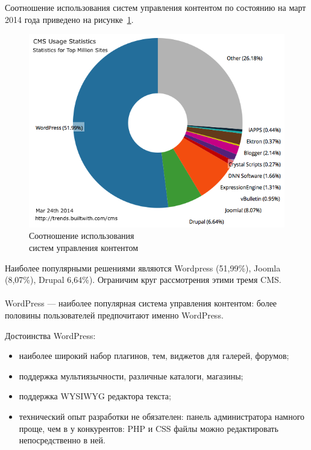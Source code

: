 Соотношение использования систем управления контентом по состоянию на март 2014 года приведено
на рисунке~\ref{fig:cms_usage_stat}.

\begin{figure}[h]
  \centering
  \includegraphics[width=150mm]{pic/cms_usage_statistics.png}
  \caption{Соотношение использования \\ систем управления контентом}
  \label{fig:cms_usage_stat}
\end{figure}

Наиболее популярными решениями являются Wordpress (51{,}99\%), Joomla (8{,}07\%), Drupal 6{,}64\%).
Ограничим круг рассмотрения этими тремя CMS.

\pagebreak
\paragraph{}
WordPress --- наиболее популярная система управления контентом:
более половины пользователей предпочитают именно WordPress.

Достоинства WordPress:
\begin{itemize}
\item
  наиболее широкий набор плагинов, тем, виджетов для галерей, форумов;
\item
  поддержка мультиязычности, различные каталоги, магазины;
\item
  поддержка WYSIWYG редактора текста;
\item
  технический опыт разработки не обязателен: панель администратора намного проще, чем в у конкурентов:
  PHP и CSS файлы можно редактировать непосредственно в ней.
\end{itemize}


